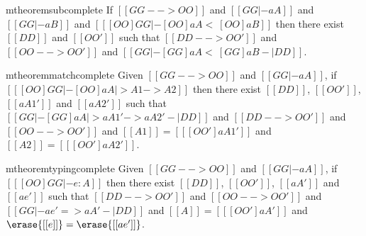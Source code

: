\begin{restatable}{mtheorem}{subcomplete} \label{thm:sub_completeness}
  If $[[ GG --> OO  ]]$ and $[[ GG |- aA  ]]$ and $[[ GG |- aB  ]]$ and $[[  [OO]GG |- [OO]aA <~ [OO]aB  ]]$ then
  there exist $[[DD]]$ and $[[OO']]$ such that $[[DD --> OO']]$ and $[[OO --> OO']]$ and $[[  GG |- [GG]aA <~ [GG]aB -| DD ]]$.
\end{restatable}


\begin{restatable}{mtheorem}{matchcomplete} \label{thm:match_complete}%
  Given $[[ GG --> OO  ]]$ and $[[ GG |- aA  ]]$, if
  $[[ [OO]GG |- [OO]aA |> A1 -> A2  ]]$
  then there exist $[[DD]]$, $[[OO']]$, $[[aA1']]$ and $[[aA2']]$ such that $[[ GG |- [GG]aA |> aA1' -> aA2' -| DD   ]]$
  and $[[ DD --> OO'  ]]$ and $[[ OO --> OO'  ]]$ and $[[A1]] = [[ [OO']aA1'  ]]$ and $[[A2]] = [[ [OO']aA2'  ]]$.
\end{restatable}



\begin{restatable}{mtheorem}{typingcomplete}
  Given $[[GG --> OO]]$ and $[[GG |- aA]]$, if $[[ [OO]GG |- e : A ]]$ then there exist $[[DD]]$, $[[OO']]$, $[[aA']]$ and $[[ae']]$
  such that $[[DD --> OO']]$ and $[[OO --> OO']]$ and $[[  GG |- ae' => aA' -| DD  ]]$ and $[[A]] = [[ [OO']aA'  ]]$ and $\erase{[[e]]} = \erase{[[ae']]}$.
\end{restatable}

